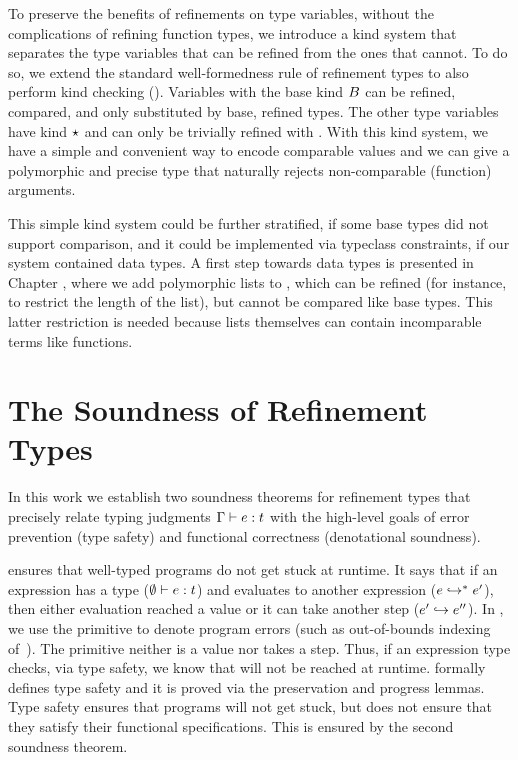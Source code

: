 %
To preserve the benefits of refinements
on type variables, without the complications
of refining function types, we introduce
a kind system that separates the type
variables that can be refined from the
ones that cannot.
%
To do so, we extend the standard well-formedness rule of refinement types
to also perform kind checking (\isWellFormed{\tcenv}{\stype}{\skind}).
%
Variables with the base kind $B$
can be refined, compared, and only
substituted by base, refined types.
%
The other type variables have kind $\star$
and can only be trivially refined with \ttrue.
With this kind system, we have a simple
and convenient way to encode comparable values
and we can give 
a polymorphic and precise type that
naturally rejects non-comparable
(\eg function) arguments.


This simple kind system could be further stratified,
\ie if some base types did not support comparison,
and it could be implemented via typeclass constraints,
if our system contained data types.
A first step towards data types is presented in Chapter
, where we add polymorphic lists to \sysrf,
which can be refined (for instance, to restrict the length
of the list), but cannot be compared like base types. This 
latter restriction is needed because lists themselves can
contain incomparable terms like functions.


\section{The Soundness of Refinement Types}
\label{sec:overview:soundness}

In this work we establish two soundness theorems for refinement types
that precisely relate typing judgments ${\mathrm{\Gamma}} \vdash {e} : {t}$
with the high-level goals of error prevention (type safety) and
functional correctness (denotational soundness).

 ensures that well-typed programs 
do not get stuck at runtime.
It says that  if an expression has a type (${\emptyset} \vdash {e} : {t}$)
and evaluates to another expression (${e} \hookrightarrow^{*} {e'}$),
then either evaluation reached a value 
or it can take another step (${\sexpr'}\step{\sexpr''}$).
In \sysrf, we use the primitive \eerr to denote program errors 
(such as out-of-bounds indexing of~).
The \eerr primitive neither is a value nor takes a step.
Thus, if an expression type checks, via type safety, 
we know that \eerr will not be reached at runtime.
 formally defines type safety 
and it is proved via the preservation and progress lemmas.
%
Type safety ensures that programs will not get stuck, but does not ensure that they
satisfy their functional specifications. This is ensured by the second soundness theorem.

